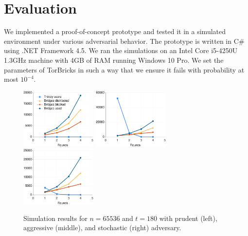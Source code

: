 \documentclass{sig-alternate-05-2015}
\newcommand{\bricks}{}
\def\bricks/{\mbox{TorBricks}}
\begin{document}
\section{Evaluation} \label{sec:simulations}
We implemented a proof-of-concept prototype and tested it in a simulated environment under various adversarial behavior. The prototype is written in C\# using .NET Framework 4.5. We ran the simulations on an Intel Core i5-4250U 1.3GHz machine with 4GB of RAM running Windows 10 Pro. We set the parameters of \bricks/ in such a way that we ensure it fails with probability at most $10^{-4}$. 

\begin{figure}
	\hspace{-0.8em}\includegraphics[width=0.34\textwidth]{images/plot-prudent-65536.eps}
	\hspace{-0.5em}\includegraphics[width=0.34\textwidth]{images/plot-aggressive-65536.eps}
	\hspace{-0.5em}\includegraphics[width=0.34\textwidth]{images/plot-stochastic-65536.eps}
	\caption{Simulation results for ${n=65536}$ and ${t=180}$ with prudent (left), aggressive (middle), and stochastic (right) adversary.}
	\label{fig:plot1} 
\end{figure}
\end{document}
